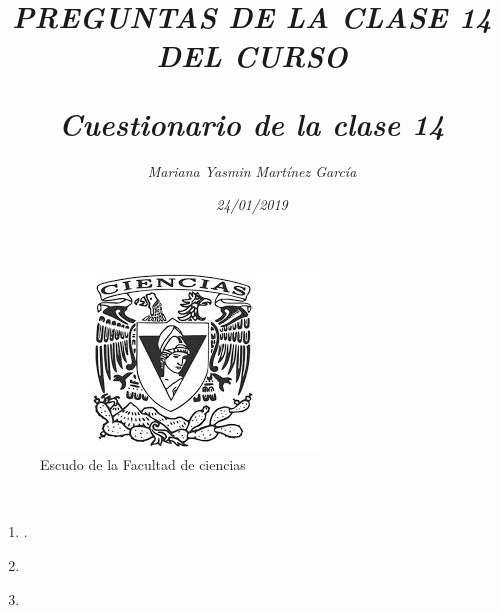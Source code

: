 \documentclass{article}
\title{\Huge\item\color{magenta}\textit{PREGUNTAS DE LA CLASE 14 DEL CURSO}}
\author{\Large\textit{Mariana Yasmin Martínez García}}
\date{\Large\textit{24/01/2019}}
\begin{document}
\begin{figure}[t]
	\centering
	\includegraphics[width=0.7\linewidth]{Imagenes/1}
	\caption{Escudo de la Facultad de ciencias}
	\label{figura:1}
\end{figure}

	\maketitle
		
	\newpage
	
	\title{\huge\color{magenta}\textbf{\textit{Cuestionario de la clase 14}}} \\
	\begin{enumerate}
		 
		 \item{\Large\color{purple} }.
		 \item{\Large\color{purple} }
		 \item{\Large\color{purple} }
	\end{enumerate}
	
\end{document}
